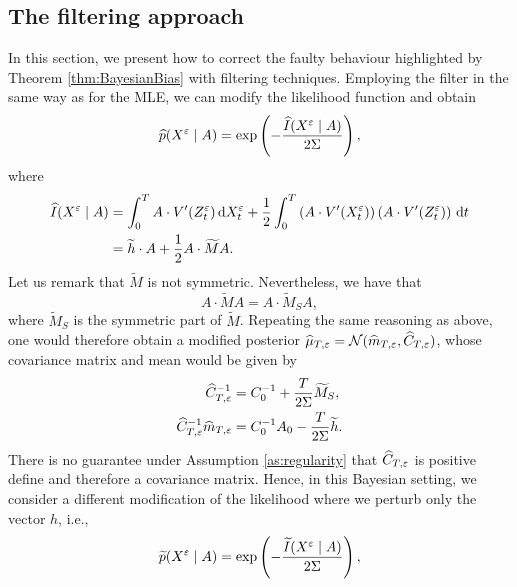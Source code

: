 \documentclass[10pt]{article}
\begin{document}
\subsection{The filtering approach}\label{sec:BayesianFilter}

In this section, we present how to correct the faulty behaviour highlighted by Theorem \ref{thm:BayesianBias} with filtering techniques. Employing the filter in the same way as for the MLE, we can modify the likelihood function and obtain 
\begin{equation}
	\widehat p(X^\varepsilon \mid A) = \exp\left(-\frac{\widehat I(X^\varepsilon\mid A)}{2\Sigma} \right), 
\end{equation}
where 
\begin{equation}
\begin{aligned}
	\widehat I(X^\varepsilon \mid A) & = \int_0^T A \cdot V'(Z^\varepsilon_t) \,\mathrm{d} X^\varepsilon_t + \frac12 \int_0^T \left(A \cdot V'(X^\varepsilon_t)\right)\left(A \cdot V'(Z^\varepsilon_t)\right) \,\mathrm{d} t \\
	&= \widetilde h \cdot A + \frac12 A \cdot \widetilde M A.
\end{aligned}
\end{equation}
Let us remark that $\widetilde M$ is not symmetric. Nevertheless, we have that
\begin{equation}
	A \cdot \widetilde M A = A \cdot \widetilde M_S A,
\end{equation}
where $\widetilde M_S$ is the symmetric part of $\widetilde M$. Repeating the same reasoning as above, one would therefore obtain a modified posterior $\widehat \mu_{T, \varepsilon} = \mathcal N(\widehat m_{T, \varepsilon}, \widehat C_{T, \varepsilon})$, whose covariance matrix and mean would be given by
\begin{equation}
\begin{aligned}
	\widehat C_{T, \varepsilon}^{-1} &= C_0^{-1} + \frac{T}{2\Sigma} \widetilde M_S, \\
	\widehat C_{T,\varepsilon}^{-1}\widehat m_{T,\varepsilon} &= C_0^{-1}A_0 - \frac{T}{2\Sigma} \widetilde h. 
\end{aligned}	
\end{equation}
There is no guarantee under Assumption \ref{as:regularity} that $\widehat C_{T, \varepsilon}$ is positive define and therefore a covariance matrix. Hence, in this Bayesian setting, we consider a different modification of the likelihood where we perturb only the vector $h$, i.e.,
\begin{equation}
	\widetilde p(X^\varepsilon \mid A) = \exp\left(-\frac{\widetilde I(X^\varepsilon\mid A)}{2\Sigma} \right), 
\end{equation}
\end{document}
